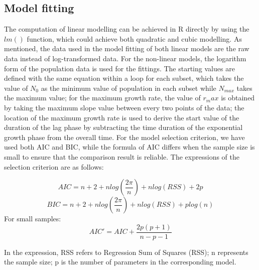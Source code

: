 \documentclass[11pt, oneside]{article}
\begin{document}
 		\subsection{Model fitting}
		
		The computation of linear modelling can be achieved in R directly by using the \(lm()\) function, which could achieve both quadratic and cubic modelling. As mentioned, the data used in the model fitting of both linear models are the raw data instead of log-transformed data. For the non-linear models, the logarithm form of the population data is used for the fittings. The starting values are defined with the same equation within a loop for each subset, which takes the value of \(N_0\) as the minimum value of population in each subset while \(N_{max}\) takes the maximum value; for the maximum growth rate, the value of \(r_max\) is obtained by taking the maximum slope value between every two points of the data; the location of the maximum growth rate is used to derive the start value of the duration of the lag phase by subtracting the time duration of the exponential growth phase from the overall time. For the model selection criterion, we have used both AIC and BIC, while the formula of AIC differs when the sample size is small to ensure that the comparison result is reliable. The expressions of the selection criterion are as follows:
		
		\[AIC = n + 2 + nlog(\frac{2\pi}{n}) + nlog(RSS) + 2p\]
		\[BIC = n + 2 + nlog(\frac{2\pi}{n}) + nlog(RSS) + plog(n)\]
		For small samples:
		\[AIC' = AIC + \frac{2p(p + 1)}{n - p - 1}\]
		
		\noindent In the expression, RSS refers to Regression Sum of Squares (RSS); n represents the sample size; p is the number of parameters in the corresponding model.
\end{document}
